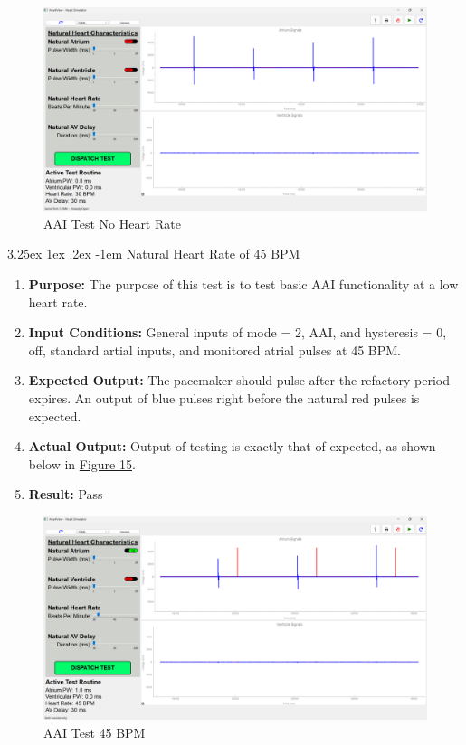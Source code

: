 \documentclass{article}
\makeatletter
\renewcommand\paragraph{\@startsection{paragraph}{5}{\z@}%
  {3.25ex \@plus1ex \@minus.2ex}%
  {-1em}%
  {\normalfont\normalsize\bfseries}}
\makeatother
\begin{document}
\begin{tcolorbox}
    \begin{figure}[H]
        \label{AAItestnohr}
        \includegraphics[width=\textwidth]{AAItestnohr.png}
        \caption{AAI Test No Heart Rate}
    \end{figure}
\end{tcolorbox}

\newpage
\paragraph{Natural Heart Rate of 45 BPM}

\begin{enumerate}[label=]
   \item \textbf{Purpose:} The purpose of this test is to test basic AAI functionality at a low heart rate.
   \item \textbf{Input Conditions:} General inputs of mode = 2, AAI, and hysteresis = 0, off, standard 
   artial inputs, and monitored atrial pulses at 45 BPM.
   \item \textbf{Expected Output:} The pacemaker should pulse after the refactory period expires. An output of blue pulses right before the natural 
   red pulses is expected.
   \item \textbf{Actual Output:} Output of testing is exactly that of expected, as shown below in \hyperref[AAItest45]{Figure 15}.
   \item \textbf{Result:} Pass
\end{enumerate}


\begin{tcolorbox}
    \begin{figure}[H]\label{AAItest45}
        \includegraphics[width=\textwidth]{AAItest45.png}
        \caption{AAI Test 45 BPM}      
    \end{figure}
\end{tcolorbox}
\end{document}
